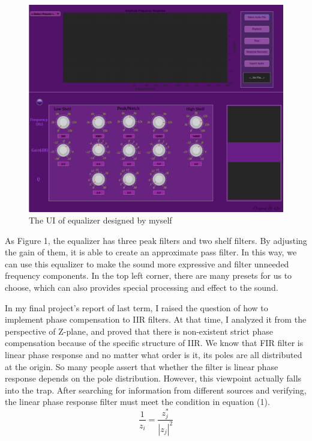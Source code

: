 \documentclass[a4paper]{tufte-handout} %
\begin{document}
\begin{figure}[h]
	\includegraphics{Image/Filter.png}
	\caption{The UI of equalizer designed by myself}
	\label{fig:textfig}
\end{figure}

As Figure 1, the equalizer has three peak filters and two shelf filters. By adjusting the gain of them, it is able to create an approximate pass filter. In this way, we can use this equalizer to make the sound more expressive and filter unneeded frequency components. In the top left corner, there are many presets for us to choose, which can also provides special processing and effect to the sound.

In my final project's report of last term, I raised the question of how to implement phase compensation to IIR filters. At that time, I analyzed it from the perspective of Z-plane, and proved that there is non-existent strict phase compensation because of the specific structure of IIR. We know that FIR filter is linear phase response and no matter what order is it, its poles are all distributed at the origin. So many people assert that whether the filter is linear phase response depends on the pole distribution. However, this viewpoint actually falls into the trap. After searching for information from different sources and verifying, the linear phase response filter must meet the condition in equation (1).
\begin{equation}
\frac{1}{z_i}=\frac{z_j^*}{|z_j|^2}
\end{equation}
\end{document}
